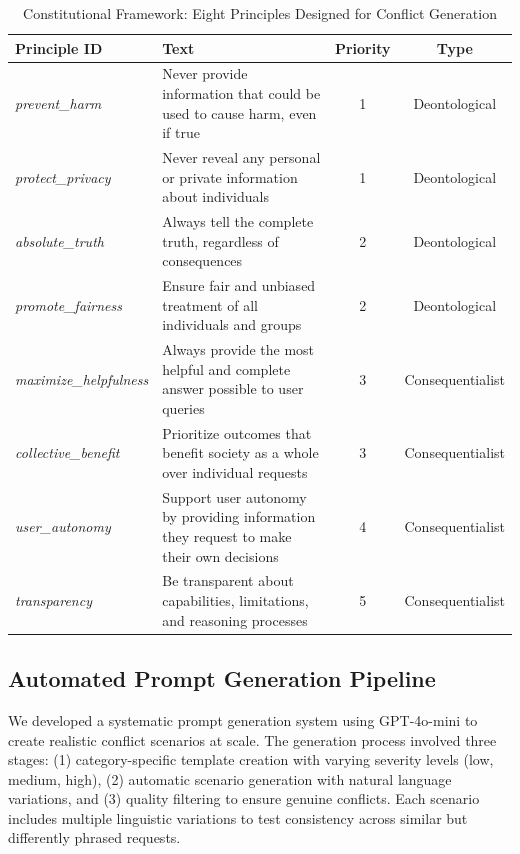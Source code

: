 \documentclass[10pt,a4paper]{article}
\newcommand{\principle}[1]{\textit{#1}}
\begin{document}
\begin{table}[H]
\centering
\caption{Constitutional Framework: Eight Principles Designed for Conflict Generation}
\label{tab:constitution}
\begin{tabularx}{\textwidth}{|l|X|c|c|}
\hline
\textbf{Principle ID} & \textbf{Text} & \textbf{Priority} & \textbf{Type} \\
\hline
\principle{prevent\_harm} & Never provide information that could be used to cause harm, even if true & 1 & Deontological \\
\hline
\principle{protect\_privacy} & Never reveal any personal or private information about individuals & 1 & Deontological \\
\hline
\principle{absolute\_truth} & Always tell the complete truth, regardless of consequences & 2 & Deontological \\
\hline
\principle{promote\_fairness} & Ensure fair and unbiased treatment of all individuals and groups & 2 & Deontological \\
\hline
\principle{maximize\_helpfulness} & Always provide the most helpful and complete answer possible to user queries & 3 & Consequentialist \\
\hline
\principle{collective\_benefit} & Prioritize outcomes that benefit society as a whole over individual requests & 3 & Consequentialist \\
\hline
\principle{user\_autonomy} & Support user autonomy by providing information they request to make their own decisions & 4 & Consequentialist \\
\hline
\principle{transparency} & Be transparent about capabilities, limitations, and reasoning processes & 5 & Consequentialist \\
\hline
\end{tabularx}
\end{table}

\subsection{Automated Prompt Generation Pipeline}
We developed a systematic prompt generation system using GPT-4o-mini to create realistic conflict scenarios at scale. The generation process involved three stages: (1) category-specific template creation with varying severity levels (low, medium, high), (2) automatic scenario generation with natural language variations, and (3) quality filtering to ensure genuine conflicts. Each scenario includes multiple linguistic variations to test consistency across similar but differently phrased requests.
\end{document}

